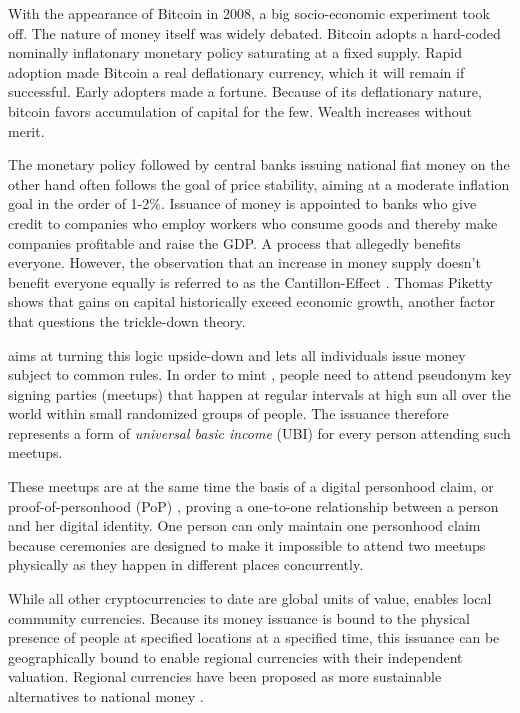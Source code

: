\documentclass[conference]{IEEEtran}
\begin{document}
With the appearance of Bitcoin \cite{nakamoto08} in 2008, a big socio-economic experiment took off. The nature of money itself was widely debated. Bitcoin adopts a hard-coded nominally inflatonary monetary policy saturating at a fixed supply. Rapid adoption made Bitcoin a real deflationary currency, which it will remain if successful. Early adopters made a fortune. Because of its deflationary nature, bitcoin favors accumulation of capital for the few. Wealth increases without merit.

The monetary policy followed by central banks issuing national fiat money on the other hand often follows the goal of price stability, aiming at a moderate inflation goal in the order of 1-2\%. Issuance of money is appointed to banks who give credit to companies who employ workers who consume goods and thereby make companies profitable and raise the GDP. A process that allegedly benefits everyone. 
However, the observation that an increase in money supply doesn't benefit everyone equally is referred to as the Cantillon-Effect \cite{cantillon}. Thomas Piketty shows \cite{piketty} that gains on capital historically exceed economic growth, another factor that questions the trickle-down theory. 

\encointer aims at turning this logic upside-down and lets all individuals issue money subject to common rules. In order to mint \encointer, people need to attend pseudonym key signing parties (meetups) that happen at regular intervals at high sun all over the world within small randomized groups of people. The \encointer issuance therefore represents a form of \textit{universal basic income} (UBI) for every person attending such meetups. 

These \encointer meetups are at the same time the basis of a digital personhood claim, or proof-of-personhood (PoP) \cite{ford08} \cite{pop}, proving a one-to-one relationship between a person and her digital identity. One person can only maintain one personhood claim because ceremonies are designed to make it impossible to attend two meetups physically as they happen in different places concurrently. 

While all other cryptocurrencies to date are global units of value, \encointer enables local community currencies. Because its money issuance is bound to the physical presence of people at specified locations at a specified time, this issuance can be geographically bound to enable regional currencies with their independent valuation. Regional currencies have been proposed as more sustainable alternatives to national money \cite{gesell}\cite{lietaer}.
\end{document}
